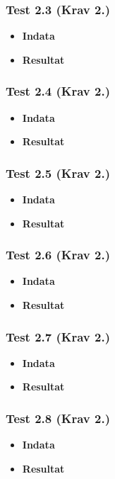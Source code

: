 \documentclass{TDP003mall}
\begin{document}
\subsubsection*{Test 2.3 (Krav 2.)}
\begin{itemize}
\item[]\textbf{Indata} 
\item[]\textbf{Resultat} 
\end{itemize}
\subsubsection*{Test 2.4 (Krav 2.)}
\begin{itemize}
\item[]\textbf{Indata} 
\item[]\textbf{Resultat} 
\end{itemize}
\subsubsection*{Test 2.5 (Krav 2.)}
\begin{itemize}
\item[]\textbf{Indata} 
\item[]\textbf{Resultat} 
\end{itemize}
\subsubsection*{Test 2.6 (Krav 2.)}
\begin{itemize}
\item[]\textbf{Indata} 
\item[]\textbf{Resultat} 
\end{itemize}
\subsubsection*{Test 2.7 (Krav 2.)}
\begin{itemize}
\item[]\textbf{Indata} 
\item[]\textbf{Resultat} 
\end{itemize}
\subsubsection*{Test 2.8 (Krav 2.)}
\begin{itemize}
\item[]\textbf{Indata} 
\item[]\textbf{Resultat} 
\end{itemize}
\end{document}
